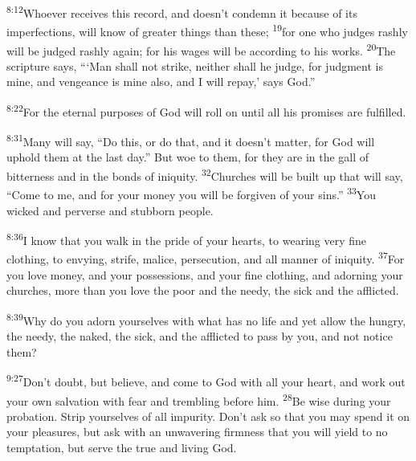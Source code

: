 \documentclass[openany,12pt,english]{book}
\newenvironment{para}{\par\pretolerance=100\tolerance=200\setlength{\emergencystretch}{0.6em}\relax}{\par}
\begin{document}
\begin{para}
    \textsuperscript{8:12}\thinspace{}Who\-ev\-er receives this rec\-ord, and does\-n't con\-demn it be\-cause of its imperfections, will know of greater things than these;
    \textsuperscript{19}\thinspace{}for one who judges rash\-ly will be judged rash\-ly again; for his wages will be ac\-cord\-ing to his works.
    \textsuperscript{20}\thinspace{}The scrip\-ture says, “‘Man shall not strike, nei\-ther shall he judge, for judg\-ment is mine, and venge\-ance is mine al\-so, and I will re\-pay,’ says God.”
\end{para}

\begin{para}
    \textsuperscript{8:22}\thinspace{}For the e\-ter\-nal purposes of God will roll on un\-til all his promises are ful\-filled.
\end{para}

\bigskip{}

\begin{para}
    \textsuperscript{8:31}\thinspace{}Man\-y will say, “Do this, or do that, and it does\-n't mat\-ter, for God will up\-hold them at the last day.” But woe to them, for they are in the gall of bit\-ter\-ness and in the bonds of in\-iq\-ui\-ty.
    \textsuperscript{32}\thinspace{}Churches will be built up that will say, “Come to me, and for your mon\-ey you will be for\-giv\-en of your sins.”
    \textsuperscript{33}\thinspace{}You wick\-ed and per\-verse and stub\-born peo\-ple.
\end{para}

\begin{para}
    \textsuperscript{8:36}\thinspace{}I know that you walk in the pride of your hearts, to wear\-ing ver\-y fi\-ne cloth\-ing, to en\-vy\-ing, strife, mal\-ice, per\-se\-cu\-tion, and all man\-ner of in\-iq\-ui\-ty.
    \textsuperscript{37}\thinspace{}For you love mon\-ey, and your possessions, and your fi\-ne cloth\-ing, and adorning your churches, more than you love the poor and the needy, the sick and the afflicted.
\end{para}

\begin{para}
    \textsuperscript{8:39}\thinspace{}Why do you a\-dorn your\-selves with what has no life and yet al\-low the hun\-gry, the needy, the na\-ked, the sick, and the afflicted to pass by you, and not no\-tice them?
\end{para}

\begin{para}
    \textsuperscript{9:27}\thinspace{}Don't doubt, but be\-lieve, and come to God with all your heart, and work out your own sal\-va\-tion with fear and trem\-bling be\-fore him.
    \textsuperscript{28}\thinspace{}Be wise dur\-ing your pro\-ba\-tion. Strip your\-selves of all im\-pu\-ri\-ty. Don't ask so that you may spend it on your pleasures, but ask with an un\-wa\-ver\-ing firm\-ness that you will yield to no temp\-ta\-tion, but serve the true and liv\-ing God.
\end{para}
\end{document}
